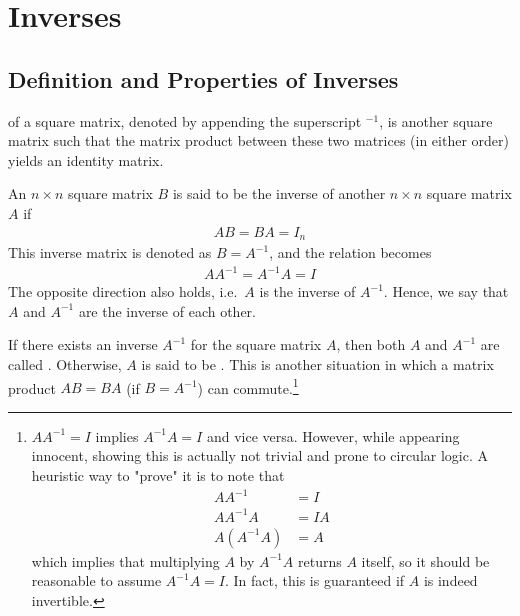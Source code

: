 \section{Inverses}
\label{section:inv}
\subsection{Definition and Properties of Inverses}
\label{subsection:invsub}
 of a square matrix, denoted by appending the superscript $^{-1}$, is another square matrix such that the matrix product between these two matrices (in either order) yields an identity matrix.
\begin{defn}[Inverse]
\label{defn:inverse}
An $n \times n$ square matrix $B$ is said to be the inverse of another $n \times n$ square matrix $A$ if 
\begin{align}
AB = BA = I_n    
\end{align}
This inverse matrix is denoted as $B = A^{-1}$, and the relation becomes 
\begin{align}
AA^{-1} = A^{-1}A = I    
\end{align}
The opposite direction also holds, i.e.\ $A$ is the inverse of $A^{-1}$. Hence, we say that $A$ and $A^{-1}$ are the inverse of each other.
\end{defn}
If there exists an inverse $A^{-1}$ for the square matrix $A$, then both $A$ and $A^{-1}$ are called . Otherwise, $A$ is said to be . This is another situation in which a matrix product $AB = BA$ (if $B=A^{-1}$) can commute.\footnote{$AA^{-1} = I$ implies $A^{-1}A = I$ and vice versa. However, while appearing innocent, showing this is actually not trivial and prone to circular logic. A heuristic way to "prove" it is to note that
\begin{align*}
AA^{-1} &= I \\
AA^{-1}A &= IA \\
A(A^{-1}A) &= A
\end{align*}
which implies that multiplying $A$ by $A^{-1}A$ returns $A$ itself, so it should be reasonable to assume $A^{-1}A = I$. In fact, this is guaranteed if $A$ is indeed invertible.}\par %
